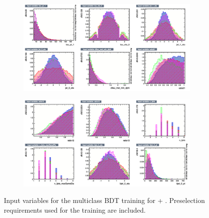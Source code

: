   \begin{figure}[htbp]
    \centering
  \begin{subfigure}{0.95\linewidth}
    \centering
    \includegraphics[width=\linewidth]{images/plots_tH_tHqb_for_thesis/variables_id_c3.png}
  \end{subfigure}
  \vspace{0.5cm} %
  \begin{subfigure}{0.95\linewidth}
    \centering
    \includegraphics[width=\linewidth]{images/plots_tH_tHqb_for_thesis/variables_id_c4.png}
  \end{subfigure}
  \vspace{0.5cm} %
  \caption{Input variables for the multiclass BDT training for \thtt + \ttHtt. Preselection requirements used for the training are included.}
  \label{th_tth_vars_tmva_2}
  \end{figure}

